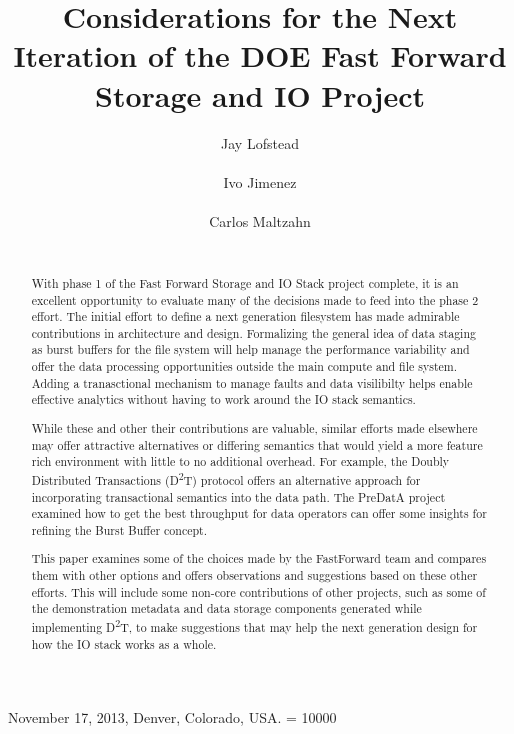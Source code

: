 \documentclass[conference]{sig-alt-gov2}
\newcommand{\DDTns}{D\textsuperscript{2}T}
\begin{document}
 {November 17, 2013, Denver, Colorado, USA.}
\widowpenalty = 10000

\title{Considerations for the Next Iteration of the DOE Fast Forward Storage and IO Project}

\author{
\alignauthor Jay Lofstead\\
       \\
\alignauthor Ivo Jimenez\\
       \\
\alignauthor Carlos Maltzahn\\
       \\
}
\maketitle

\begin{abstract}
With phase 1 of the Fast Forward Storage and IO Stack project complete, it is
an excellent opportunity to evaluate many of the decisions made to feed into
the phase 2 effort. The initial effort to define a next generation filesystem
has made admirable contributions in architecture and design. Formalizing the
general idea of data staging as burst buffers for the file system will help
manage the performance variability and offer the data processing opportunities
outside the main compute and file system. Adding a tranasctional mechanism to
manage faults and data visilibilty helps enable effective analytics without
having to work around the IO stack semantics.

While these and other their contributions are valuable, similar efforts made
elsewhere may offer attractive alternatives or differing semantics that would
yield a more feature rich environment with little to no additional overhead.
For example, the Doubly Distributed Transactions (\DDTns) protocol offers an
alternative approach for incorporating transactional semantics into the data
path. The PreDatA project examined how to get the best throughput for data
operators can offer some insights for refining the Burst Buffer concept.

This paper examines some of the choices made by the FastForward team and
compares them with other options and offers observations and suggestions based
on these other efforts.  This will include some non-core contributions of other
projects, such as some of the demonstration metadata and data storage
components generated while implementing \DDTns, to make suggestions that may
help the next generation design for how the IO stack works as a whole.

\end{abstract}
\end{document}
